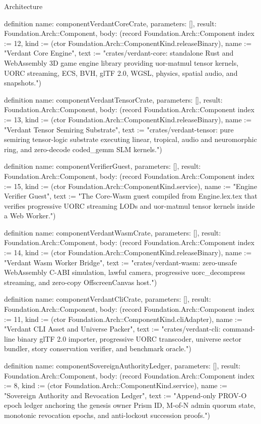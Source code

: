 \begin{lexlean}{Architecture}
\begin{semanticmodule}
definition{
  name: componentVerdantCoreCrate,
  parameters: [],
  result: Foundation.Arch::Component,
  body: (record Foundation.Arch::Component {index := 12, kind := (ctor Foundation.Arch::ComponentKind.releaseBinary), name := "Verdant Core Engine", text := "crates/verdant-core: standalone Rust and WebAssembly 3D game engine library providing uor-matmul tensor kernels, UORC streaming, ECS, BVH, glTF 2.0, WGSL, physics, spatial audio, and snapshots."})
}

definition{
  name: componentVerdantTensorCrate,
  parameters: [],
  result: Foundation.Arch::Component,
  body: (record Foundation.Arch::Component {index := 13, kind := (ctor Foundation.Arch::ComponentKind.releaseBinary), name := "Verdant Tensor Semiring Substrate", text := "crates/verdant-tensor: pure semiring tensor-logic substrate executing linear, tropical, audio and neuromorphic ring, and zero-decode coded_gemm SLM kernels."})
}

definition{
  name: componentVerifierGuest,
  parameters: [],
  result: Foundation.Arch::Component,
  body: (record Foundation.Arch::Component {index := 15, kind := (ctor Foundation.Arch::ComponentKind.service), name := "Engine Verifier Guest", text := "The Core-Wasm guest compiled from Engine.lex.tex that verifies progressive UORC streaming LODs and uor-matmul tensor kernels inside a Web Worker."})
}

definition{
  name: componentVerdantWasmCrate,
  parameters: [],
  result: Foundation.Arch::Component,
  body: (record Foundation.Arch::Component {index := 14, kind := (ctor Foundation.Arch::ComponentKind.releaseBinary), name := "Verdant Wasm Worker Bridge", text := "crates/verdant-wasm: zero-unsafe WebAssembly C-ABI simulation, lawful camera, progressive uorc_decompress streaming, and zero-copy OffscreenCanvas host."})
}

definition{
  name: componentVerdantCliCrate,
  parameters: [],
  result: Foundation.Arch::Component,
  body: (record Foundation.Arch::Component {index := 11, kind := (ctor Foundation.Arch::ComponentKind.cliAdapter), name := "Verdant CLI Asset and Universe Packer", text := "crates/verdant-cli: command-line binary glTF 2.0 importer, progressive UORC transcoder, universe sector bundler, story conservation verifier, and benchmark oracle."})
}

definition{
  name: componentSovereignAuthorityLedger,
  parameters: [],
  result: Foundation.Arch::Component,
  body: (record Foundation.Arch::Component {index := 8, kind := (ctor Foundation.Arch::ComponentKind.service), name := "Sovereign Authority and Revocation Ledger", text := "Append-only PROV-O epoch ledger anchoring the genesis owner Prism ID, M-of-N admin quorum state, monotonic revocation epochs, and anti-lockout succession proofs."})
}


\end{semanticmodule}
\end{lexlean}
